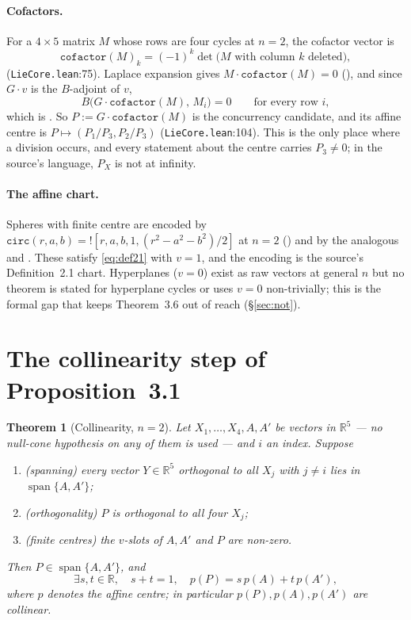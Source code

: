 \documentclass[11pt]{article}
\newtheorem{theorem}{Theorem}
\theoremstyle{definition}
\theoremstyle{remark}
\newcommand{\src}[3]{\texttt{#2}:#3}
\newcommand{\RR}{\mathbb{R}}
\begin{document}
\paragraph{Cofactors.} For a $4\times5$ matrix $M$ whose rows are four cycles at $n=2$, the cofactor
vector is
\[
\texttt{cofactor}(M)_k=(-1)^k\det\bigl(M\text{ with column }k\text{ deleted}\bigr),
\]
 (\src{PaperK}{LieCore.lean}{75}). Laplace expansion gives
$M\cdot\texttt{cofactor}(M)=0$ (), and since $G\cdot v$ is the
$B$-adjoint of $v$,
\begin{equation}\label{eq:cofactororth}
B\bigl(G\cdot\texttt{cofactor}(M),\,M_i\bigr)=0 \qquad\text{for every row } i,
\end{equation}
which is . So $P:=G\cdot\texttt{cofactor}(M)$ is the concurrency
candidate, and its affine centre is  $P\mapsto(P_1/P_3,P_2/P_3)$
(\src{PaperK}{LieCore.lean}{104}). This is the only place where a division occurs, and every
statement about the centre carries $P_3\neq0$; in the source's language, $P_X$ is not at infinity.

\paragraph{The affine chart.} Spheres with finite centre are encoded by
$\texttt{circ}(r,a,b)=![r,a,b,1,(r^2-a^2-b^2)/2]$ at $n=2$ () and by the
analogous  and . These satisfy \eqref{eq:def21} with $v=1$, and
the encoding is the source's Definition~2.1 chart. Hyperplanes ($v=0$) exist as raw vectors at
general $n$ but no theorem is stated for hyperplane cycles or uses $v=0$ non-trivially; this is the
formal gap that keeps Theorem~3.6 out of reach (\S\ref{sec:not}).

\section{The collinearity step of Proposition~3.1}\label{sec:prop31}

\begin{theorem}[Collinearity, $n=2$]\label{thm:prop31}
Let $X_1,\dots,X_4,A,A'$ be vectors in $\RR^5$ --- no null-cone hypothesis on any of them is used
--- and $i$ an index. Suppose
\begin{enumerate}
\item (spanning) every vector $Y\in\RR^5$ orthogonal to all $X_j$ with $j\neq i$ lies in
$\operatorname{span}\{A,A'\}$;
\item (orthogonality) $P$ is orthogonal to all four $X_j$;
\item (finite centres) the $v$-slots of $A,A'$ and $P$ are non-zero.
\end{enumerate}
Then $P\in\operatorname{span}\{A,A'\}$, and
\[
\exists s,t\in\RR,\quad s+t=1,\quad p(P)=s\,p(A)+t\,p(A'),
\]
where $p$ denotes the affine centre; in particular $p(P),p(A),p(A')$ are collinear.
\end{theorem}
\end{document}
